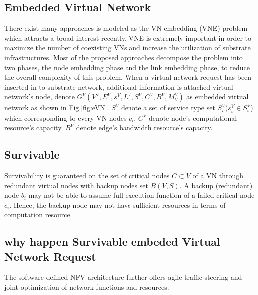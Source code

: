 \subsection{Embedded Virtual Network}
\label{sec:embeddedVirtualNetwork}
There exist many approaches is modeled as the VN embedding (VNE) problem which attracts a broad interest recently. VNE is extremely important in order to maximize the number of coexisting VNs and increase the utilization of substrate infrastructures. Most of the proposed approaches decompose the problem into two phases, the node embedding phase and the link embedding phase, to reduce the overall complexity of this problem. When a virtual network request has been inserted in to substrate network, additional information is attached virtual network's node, denote $G^V (V^V,E^V,s^V,L^V,S^V,C^V,B^V,M^V_V)$ as embedded virtual network as shown in Fig.\ref{fig:eVN}. $S^V$ denote a set of service type set $S^V_i$($s^V_i\in S^V_i$) which corresponding to every VN nodes $v_i$. $C^V$ denote node's computational resource's capacity. $B^V$ denote edge's bandwidth resource's capacity.

\subsection{Survivable}

Survivability is guaranteed on the set of critical nodes $C\subset V$ of a VN through redundant virtual nodes with backup nodes set $B(V,S)$. A backup (redundant) node $b_i$ may not be able to assume full execution function of a failed critical node $c_i$. Hence, the backup node may not have sufficient resources in terms of computation resource.





\subsection{why happen Survivable embeded Virtual Network Request}
The software-defined NFV architecture further offers agile traffic steering and joint optimization of network functions and resources.


